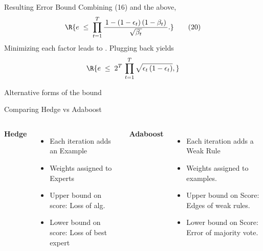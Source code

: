 \documentclass{beamer}
\begin{document}
\begin{frame}{Resulting Error Bound}
Combining (16) and the above,
\[
  \R{
    e 
    \;\le\;
    \prod_{t=1}^T \frac{\,1 - (1-\epsilon_t)\,(1-\beta_t)\,}{\sqrt{\beta_t}}.
  }
  \tag{20}
\]
Minimizing each factor leads to . Plugging back yields
\[
  \R{
    e 
    \;\le\;
    2^T \,\prod_{t=1}^T \sqrt{\epsilon_t\,(1-\epsilon_t)},
  }
\]
\end{frame}

\begin{frame}{Alternative forms of the bound}
\end{frame}



\begin{frame}{Comparing Hedge vs Adaboost}
  \begin{columns}[T,onlytextwidth] 

    \textbf{Hedge}
    \begin{itemize}
      \item Each iteration adds an Example
      \item Weights assigned to Experts
      \item Upper bound on score: Loss of alg.
      \item Lower bound on score: Loss of best expert
    \end{itemize}

    \textbf{Adaboost}
    \begin{itemize}
    \item Each iteration adds a Weak Rule
    \item Weights assigned to examples.
    \item Upper bound on Score: Edges of weak rules.
    \item Lower bound on Score: Error of majority vote.
    \end{itemize}

  \end{columns}
\end{frame}
\end{document}
